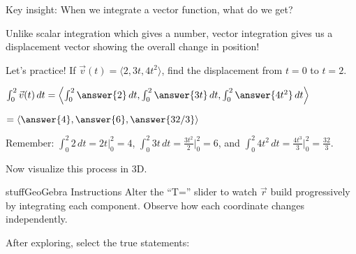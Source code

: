 \documentclass{ximera}
\begin{document}
\begin{problem}
Key insight: When we integrate a vector function, what do we get?

\begin{multipleChoice}
\end{multipleChoice}

\begin{feedback}
Unlike scalar integration which gives a number, vector integration gives us a displacement vector showing the overall change in position!
\end{feedback}
\end{problem}

\begin{problem}
Let's practice! If $\vec{v}(t) = \langle 2, 3t, 4t^2 \rangle$, find the displacement from $t=0$ to $t=2$.

$\int_0^2 \vec{v}(t) \, dt = \left\langle \int_0^2 \answer{2} \, dt, \int_0^2 \answer{3t} \, dt, \int_0^2 \answer{4t^2} \, dt \right\rangle$

$= \langle \answer{4}, \answer{6}, \answer{32/3} \rangle$

\begin{feedback}
Remember: $\int_0^2 2 \, dt = 2t \big|_0^2 = 4$, $\int_0^2 3t \, dt = \frac{3t^2}{2} \big|_0^2 = 6$, and $\int_0^2 4t^2 \, dt = \frac{4t^3}{3} \big|_0^2 = \frac{32}{3}$.
\end{feedback}
\end{problem}

\begin{problem}
Now visualize this process in 3D.

\begin{expandable}{stuff}{GeoGebra Instructions}
    Alter the ``T='' slider to watch $\vec{r}$ build progressively by integrating each component. Observe how each coordinate changes independently.
\end{expandable}

\begin{center}
\end{center}

After exploring, select the true statements:
\begin{selectAll}
\end{selectAll}
\end{problem}
\end{document}
